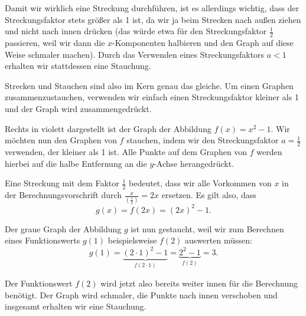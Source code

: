 \documentclass[../../main.tex]{subfiles}
\begin{document}
Damit wir wirklich eine Streckung durchführen, ist es allerdings wichtig, dass der Streckungsfaktor stets größer als 1 ist, da wir ja beim Strecken nach außen ziehen und nicht nach innen drücken (das würde etwa für den Streckungsfaktor $\frac{1}{2}$ passieren, weil wir dann die $x$-Komponenten halbieren und den Graph auf diese Weise schmaler machen). Durch das Verwenden eines Streckungsfaktors $a<1$ erhalten wir stattdessen eine Stauchung.

Strecken und Stauchen sind also im Kern genau das gleiche. Um einen Graphen zusammenzustauchen, verwenden wir einfach einen Streckungsfaktor kleiner als 1 und der Graph wird zusammengedrückt.

\begin{example}{}
    Rechts in violett dargestellt ist der Graph der Abbildung $f(x)=x^2-1$.
    Wir möchten nun den Graphen von $f$ stauchen, indem wir den Streckungsfaktor $a=\frac{1}{2}$ verwenden, der kleiner als 1 ist. Alle Punkte auf dem Graphen von $f$ werden hierbei auf die halbe Entfernung an die $y$-Achse herangedrückt. 
    
    Eine Streckung mit dem Faktor $\frac{1}{2}$ bedeutet, dass wir alle Vorkommen von $x$ in der Berechnungsvorschrift durch $\frac{x}{(\frac{1}{2})}=2x$ ersetzen. Es gilt also, dass \[g(x) = f(2x) = (2x)^2 - 1.\]
    
    Der graue Graph der Abbildung $g$ ist nun gestaucht, weil wir zum Berechnen eines Funktionswerts $g(1)$ beispielsweise $f(2)$ auswerten müssen: \[g(1)=\underbrace{(2\cdot 1)^2-1}_{f(2\cdot 1)}=\underbrace{2^2-1}_{f(2)}=3.\]
    
    Der Funktionswert $f(2)$ wird jetzt also bereits weiter innen für die Berechnung benötigt. Der Graph wird schmaler, die Punkte nach innen verschoben und insgesamt erhalten wir eine Stauchung.
\end{example}
\end{document}
